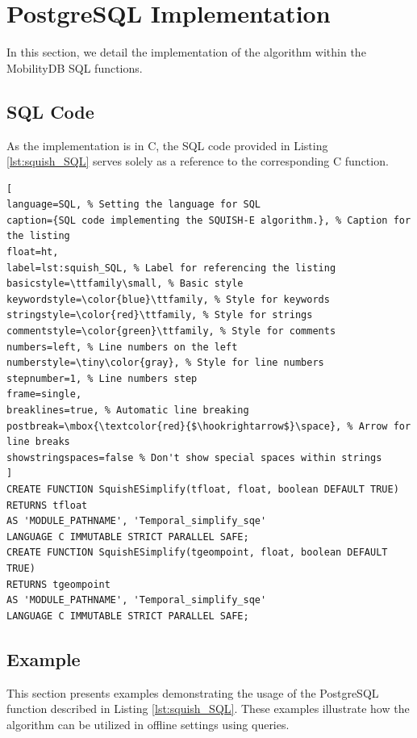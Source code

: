 \section{PostgreSQL Implementation}

In this section, we detail the implementation of the algorithm within the MobilityDB SQL functions.

\subsection{SQL Code}
As the implementation is in C, the SQL code provided in Listing \ref{lst:squish_SQL} serves solely as a reference to the corresponding C function.\\

\begin{lstlisting}[
language=SQL, % Setting the language for SQL
caption={SQL code implementing the SQUISH-E algorithm.}, % Caption for the listing
float=ht,
label=lst:squish_SQL, % Label for referencing the listing
basicstyle=\ttfamily\small, % Basic style
keywordstyle=\color{blue}\ttfamily, % Style for keywords
stringstyle=\color{red}\ttfamily, % Style for strings
commentstyle=\color{green}\ttfamily, % Style for comments
numbers=left, % Line numbers on the left
numberstyle=\tiny\color{gray}, % Style for line numbers
stepnumber=1, % Line numbers step
frame=single,
breaklines=true, % Automatic line breaking
postbreak=\mbox{\textcolor{red}{$\hookrightarrow$}\space}, % Arrow for line breaks
showstringspaces=false % Don't show special spaces within strings
]
CREATE FUNCTION SquishESimplify(tfloat, float, boolean DEFAULT TRUE)
RETURNS tfloat
AS 'MODULE_PATHNAME', 'Temporal_simplify_sqe'
LANGUAGE C IMMUTABLE STRICT PARALLEL SAFE;
CREATE FUNCTION SquishESimplify(tgeompoint, float, boolean DEFAULT TRUE)
RETURNS tgeompoint
AS 'MODULE_PATHNAME', 'Temporal_simplify_sqe'
LANGUAGE C IMMUTABLE STRICT PARALLEL SAFE;
\end{lstlisting}

\subsection{Example}
This section presents examples demonstrating the usage of the PostgreSQL function described in Listing \ref{lst:squish_SQL}. These examples illustrate how the algorithm can be utilized in offline settings using queries.\\


